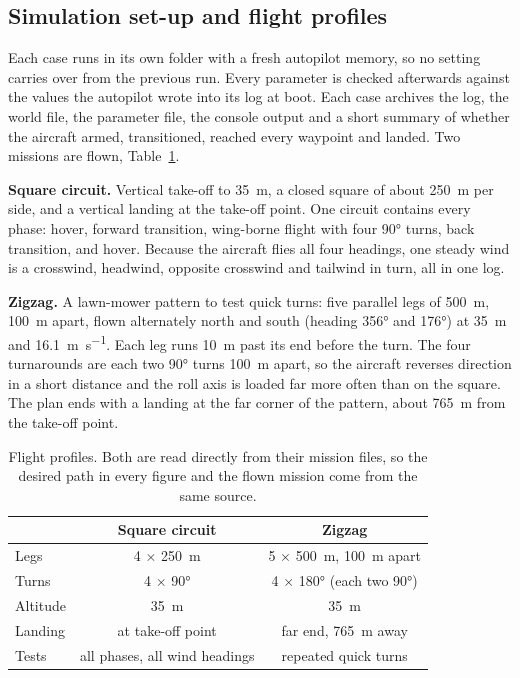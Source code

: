\documentclass{article}
\begin{document}
\subsection{Simulation set-up and flight profiles}
\label{sec:sim-to-real}
\label{sec:mission-profile}
Each case runs in its own folder with a fresh autopilot memory, so no setting carries over from the previous run. Every parameter is checked afterwards against the values the autopilot wrote into its log at boot. Each case archives the log, the world file, the parameter file, the console output and a short summary of whether the aircraft armed, transitioned, reached every waypoint and landed. Two missions are flown, Table~\ref{tab:profiles}.

\textbf{Square circuit.} Vertical take-off to \SI{35}{\meter}, a closed square of about \SI{250}{\meter} per side, and a vertical landing at the take-off point. One circuit contains every phase: hover, forward transition, wing-borne flight with four \ang{90} turns, back transition, and hover. Because the aircraft flies all four headings, one steady wind is a crosswind, headwind, opposite crosswind and tailwind in turn, all in one log.

\textbf{Zigzag.} A lawn-mower pattern to test quick turns: five parallel legs of \SI{500}{\meter}, \SI{100}{\meter} apart, flown alternately north and south (heading \ang{356} and \ang{176}) at \SI{35}{\meter} and \SI{16.1}{\meter\per\second}. Each leg runs \SI{10}{\meter} past its end before the turn. The four turnarounds are each two \ang{90} turns \SI{100}{\meter} apart, so the aircraft reverses direction in a short distance and the roll axis is loaded far more often than on the square. The plan ends with a landing at the far corner of the pattern, about \SI{765}{\meter} from the take-off point.

\begin{table}[H]
\centering
\caption{Flight profiles. Both are read directly from their mission files, so the desired path in every figure and the flown mission come from the same source.}
\label{tab:profiles}
\begin{tabular}{lcc}
\hline
 & Square circuit & Zigzag \\
\hline
Legs & 4 $\times$ \SI{250}{\meter} & 5 $\times$ \SI{500}{\meter}, \SI{100}{\meter} apart \\
Turns & 4 $\times$ \ang{90} & 4 $\times$ \ang{180} (each two \ang{90}) \\
Altitude & \SI{35}{\meter} & \SI{35}{\meter} \\
Landing & at take-off point & far end, \SI{765}{\meter} away \\
Tests & all phases, all wind headings & repeated quick turns \\
\hline
\end{tabular}
\end{table}
\end{document}
